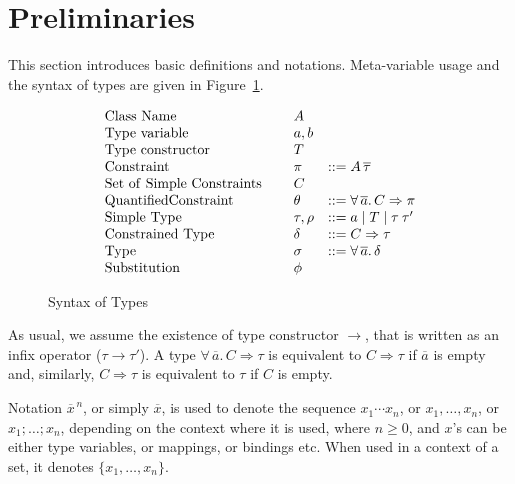 \section{Preliminaries}\label{prelimirares}

This section introduces basic definitions and notations. Meta-variable
usage and the syntax of types are given in Figure~\ref{fig:meta}.  

\begin{figure} 
\[ \begin{array}[c]{llll}
{\rm Class\ Name}         &\hspace{.1cm} & A         & \\
{\rm Type\ variable}      &         & a,b & \\
{\rm Type\ constructor}   &         & T              & \\
{\rm Constraint}          &         & \pi            & ::= A\,\overline{\tau}\\
{\rm Set\ of\ Simple\ Constraints}  &  & C           & \\
{\rm Quantified Constraint} &       & \theta         & ::= \forall\,\overline{a}.\,C\Rightarrow\pi\\
{\rm Simple\ Type}        &         & \tau,\rho      & ::= a \mid T \mid \tau\:\tau' \\
{\rm Constrained\ Type}   &         & \delta         & ::= C\Rightarrow \tau\\
{\rm Type}                &         & \sigma         & ::= \forall\,\overline{a}.\,\delta \\
{\rm Substitution}        &         & \phi           & \\
\end{array} \]
\caption{Syntax of Types}
\label{fig:meta}
\end{figure}

As usual, we assume the existence of type constructor $\to$, that is
written as an infix operator ($\tau \to \tau'$). A type
$\forall\,\overline{a}.\,C\Rightarrow \tau$ is equivalent to
$C\Rightarrow \tau$ if $\overline{a}$ is empty and, similarly,
$C\Rightarrow \tau$ is equivalent to $\tau$ if $C$ is empty.

Notation $\overline{x}^{\,n}$, or simply $\overline{x}$, is used to
denote the sequence $x_1 \cdots x_n$, or $x_1, \ldots, x_n$, or
$x_1;\ldots;x_n$, depending on the context where it is used, where
$n\geq 0$, and $x$'s can be either type variables, or mappings, or
bindings etc.  When used in a context of a set, it denotes
$\{x_1,\ldots,x_n\}$.

